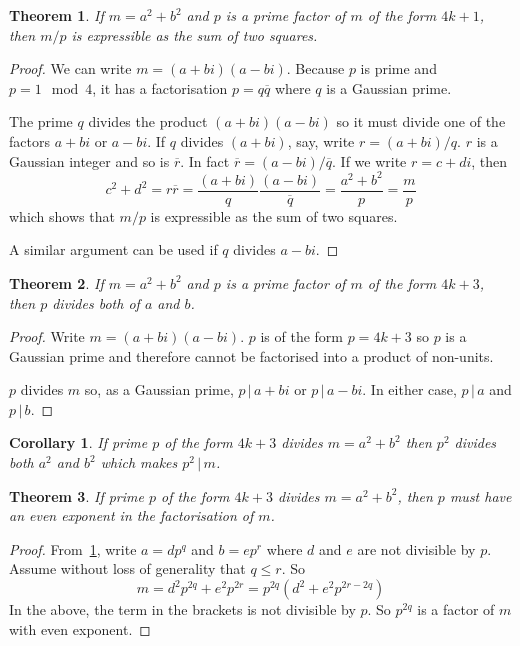 \documentclass[11pt]{amsart}
\newtheorem{theorem}{Theorem}[section]
\newtheorem{corollary}{Corollary}[section]
\begin{document}
\begin{theorem}
If $m = a^{2} + b^{2}$ and $p$ is a prime factor of $m$ of the form $4k+1$, then $m/p$ is expressible as the sum of two squares.
\end{theorem}

\begin{proof}
We can write $m = (a+b i) ( a - b i)$. Because $p$ is prime and $p = 1 \mod 4$, it has a factorisation $p = q \overline{q}$ 
where $q$ is a Gaussian prime.

The prime $q$ divides the product $(a+b i) ( a - b i)$ so it must divide one of the factors $a+bi$ or $a-bi$. If $q$ divides $(a+bi)$, say,  write $r = (a+bi) / q$. $r$ is a Gaussian integer and so is $\overline{r}$. In fact $\overline{r} = (a-bi) / \overline{q}$. If we write  $r = c + d i$, then 
$$
c^{2} + d^{2} = r \overline{r} = \frac{(a + b i)}{q} \frac{(a - b i)}{\overline{q}}= \frac{a^{2}+b^{2}}{p} = \frac{m}{p}
$$
which shows that $m/p$ is expressible as the sum of two squares.

A similar argument can be used if $q$ divides $a-bi$.
\end{proof}


\vspace{1em}

\begin{theorem}
If $m = a^{2} + b^{2}$ and $p$ is a prime factor of $m$ of the form $4k+3$, then $p$ divides both of $a$ and $b$.
\end{theorem}

\begin{proof}

Write $m = (a + b i) (a - b i)$. $p$ is of the form $p=4k+3$ so $p$ is a Gaussian prime and therefore cannot be factorised into a product of non-units.

 $p$ divides $m$ so, as a Gaussian prime, $p \, | \, a + b i$
or $p \, | \, a - b i$. In either case, $p \, | \, a $ and $p \, | \, b $.

\end{proof}

\vspace{1em}

\begin{corollary}
\label{cor:pSquaredDivM}
If prime $p$ of the form $4k+3$ divides $m = a^{2} + b^{2}$ then $p^{2}$ divides both $a^{2}$ and $b^{2}$ which makes $p^{2} \, | \, m$.
\end{corollary}

\begin{theorem}
If prime $p$ of the form $4k+3$ divides $m = a^{2} + b^{2}$, then $p$ must have an even exponent in the factorisation of $m$.
\end{theorem}

\begin{proof}
From~\cref{cor:pSquaredDivM}, write $a = d p^{q}$ and $b = e p^{r}$ where $d$ and $e$ are not divisible by $p$. Assume without loss of generality that $q \le r$.
So 
$$
m  = d^{2} p^{2q} + e^{2} p^{2r} = 
p^{2q} \left( d^{2} + e^{2} p^{2r-2q} \right)
$$
In the above, the term in the brackets is not divisible by $p$. So $p^{2q}$ is a factor of $m$ with even exponent.
\end{proof}
\end{document}
